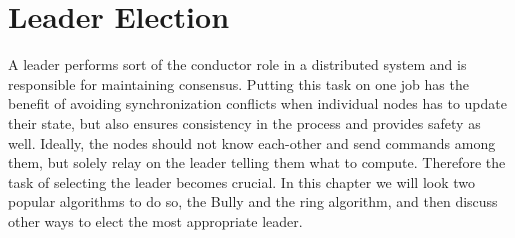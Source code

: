 \chapter{Leader Election} \label{ch:leaderElection}

A leader performs sort of the conductor role in a distributed system and is responsible for maintaining consensus. Putting this task on one job has the benefit of avoiding synchronization conflicts when individual nodes has to update their state, but also ensures consistency in the process and provides safety as well. Ideally, the nodes should not know each-other and send commands among them, but solely relay on the leader telling them what to compute. Therefore the task of selecting the leader becomes crucial. In this chapter we will look two popular algorithms to do so, the Bully and the ring algorithm, and then discuss other ways to elect the most appropriate leader.



